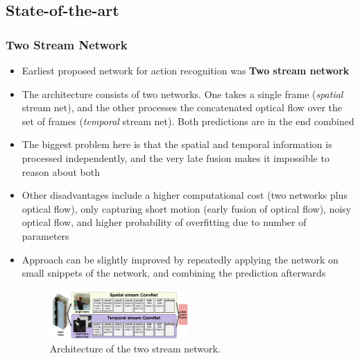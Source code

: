 \subsection{State-of-the-art}
\subsubsection{Two Stream Network}
\begin{itemize}
	\item Earliest proposed network for action recognition was \textbf{Two stream network}
	\item The architecture consists of two networks. One takes a single frame (\textit{spatial} stream net), and the other processes the concatenated optical flow over the set of frames (\textit{temporal} stream net). Both predictions are in the end combined
	\item The biggest problem here is that the spatial and temporal information is processed independently, and the very late fusion makes it impossible to reason about both
	\item Other disadvantages include a higher computational cost (two networks plus optical flow), only capturing short motion (early fusion of optical flow), noisy optical flow, and higher probability of overfitting due to number of parameters
	\item Approach can be slightly improved by repeatedly applying the network on small snippets of the network, and combining the prediction afterwards
	\begin{figure}[ht!]
		\centering
		\includegraphics[width=0.5\textwidth]{figures/cv_deep_video_two_stream_network.png}
		\caption{Architecture of the two stream network.}
		\label{fig:deep_video_two_stream_net}
	\end{figure}
\end{itemize}
